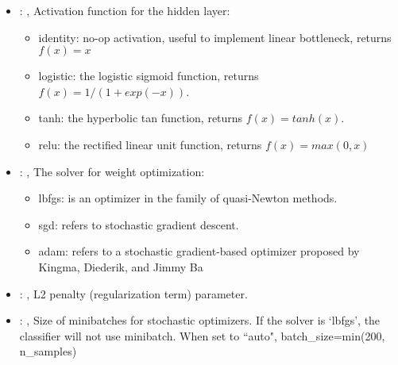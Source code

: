 \begin{itemize}
    \item {}: , 
      Activation function for the hidden layer:
      \begin{itemize}                                                    \item identity:  no-op
      activation, useful to implement linear bottleneck, returns $f(x) = x$
      \item logistic: the logistic sigmoid function, returns $f(x) = 1 / (1 + exp(-x))$.
      \item tanh: the hyperbolic tan function, returns $f(x) = tanh(x)$.
      \item relu:  the rectified linear unit function, returns $f(x) = max(0, x)$
      \end{itemize}

    \item {}: , 
      The solver for weight optimization:
      \begin{itemize}                                                    \item lbfgs: is an
      optimizer in the family of quasi-Newton methods.
      \item sgd: refers to stochastic gradient descent.
      \item adam: refers to a stochastic gradient-based optimizer proposed by Kingma, Diederik, and
      Jimmy Ba                                                  \end{itemize}

    \item {}: , 
      L2 penalty (regularization term) parameter.

    \item {}: , 
      Size of minibatches for stochastic optimizers. If the solver is `lbfgs',
      the classifier will not use minibatch. When set to ``auto", batch\_size=min(200, n\_samples)


\end{itemize}
